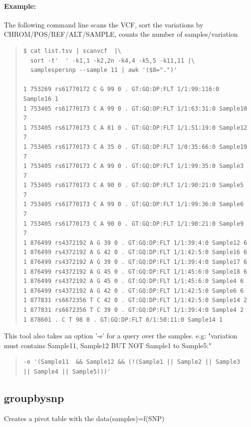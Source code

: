 \documentclass[12pt]{article}
\begin{document}
\paragraph{Example:}
The following command line scans the VCF, sort the variations by CHROM/POS/REF/ALT/SAMPLE, counts the number of samples/variation 

\begin{quote}
\begin{verbatim}
$ cat list.tsv | scanvcf  |\
  sort -t'  ' -k1,1 -k2,2n -k4,4 -k5,5 -k11,11 |\
  samplespersnp --sample 11 | awk '($8=".")'

1 753269 rs61770172 C G 99 0 . GT:GQ:DP:FLT 1/1:99:116:0 Sample16 1
1 753405 rs61770173 C A 99 0 . GT:GQ:DP:FLT 1/1:63:31:0 Sample10 7
1 753405 rs61770173 C A 81 0 . GT:GQ:DP:FLT 1/1:51:19:0 Sample12 7
1 753405 rs61770173 C A 35 0 . GT:GQ:DP:FLT 1/0:35:66:0 Sample19 7
1 753405 rs61770173 C A 99 0 . GT:GQ:DP:FLT 1/1:99:35:0 Sample3 7
1 753405 rs61770173 C A 90 0 . GT:GQ:DP:FLT 1/1:90:21:0 Sample5 7
1 753405 rs61770173 C A 99 0 . GT:GQ:DP:FLT 1/1:99:36:0 Sample6 7
1 753405 rs61770173 C A 90 0 . GT:GQ:DP:FLT 1/1:90:21:0 Sample9 7
1 876499 rs4372192 A G 39 0 . GT:GQ:DP:FLT 1/1:39:4:0 Sample12 6
1 876499 rs4372192 A G 42 0 . GT:GQ:DP:FLT 1/1:42:5:0 Sample16 6
1 876499 rs4372192 A G 39 0 . GT:GQ:DP:FLT 1/1:39:4:0 Sample17 6
1 876499 rs4372192 A G 45 0 . GT:GQ:DP:FLT 1/1:45:6:0 Sample18 6
1 876499 rs4372192 A G 45 0 . GT:GQ:DP:FLT 1/1:45:6:0 Sample4 6
1 876499 rs4372192 A G 42 0 . GT:GQ:DP:FLT 1/1:42:5:0 Sample6 6
1 877831 rs6672356 T C 42 0 . GT:GQ:DP:FLT 1/1:42:5:0 Sample14 2
1 877831 rs6672356 T C 39 0 . GT:GQ:DP:FLT 1/1:39:4:0 Sample4 2
1 878601 . C T 98 0 . GT:GQ:DP:FLT 0/1:50:11:0 Sample14 1
\end{verbatim}
\end{quote}

This tool also takes an option '-e' for a query over the samples. e.g: "variation must contains Sample11, Sample12 BUT NOT Sample1 to Sample5:"
\begin{quote}
\begin{verbatim}
-e '(Sample11  && Sample12 && (!(Sample1 || Sample2 || Sample3 || Sample4 || Sample5)))'
\end{verbatim}
\end{quote}

\subsection{groupbysnp}
Creates a pivot table with the data(samples)=f(SNP)
\end{document}
